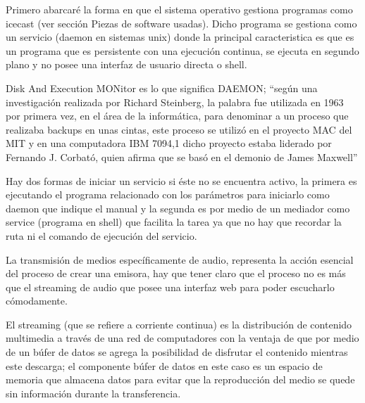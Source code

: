 \begin{multicols}{2}

Primero abarcaré la forma en que el sistema operativo gestiona programas como icecast (ver sección Piezas de software usadas). Dicho programa se gestiona como un servicio (daemon en sistemas unix) donde la principal caracteristica es que es un programa que es persistente con una ejecución continua, se ejecuta en segundo plano y no posee una interfaz de usuario directa o shell.

Disk And Execution MONitor es lo que significa DAEMON; ``según una investigación realizada por Richard Steinberg, la palabra fue utilizada en 1963 por primera vez, en el área de la informática, para denominar a un proceso que realizaba backups en unas cintas, este proceso se utilizó en el proyecto MAC del MIT y en una computadora IBM 7094,1 dicho proyecto estaba liderado por Fernando J. Corbató, quien afirma que se basó en el demonio de James Maxwell''\cite {ref1}

Hay dos formas de iniciar un servicio si éste no se encuentra activo, la primera es ejecutando el programa relacionado con los parámetros para iniciarlo como daemon que indique el manual y la segunda es por medio de un mediador como service (programa en shell) que facilita la tarea ya que no hay que recordar la ruta ni el comando de ejecución del servicio.


La transmisión de medios específicamente de audio, representa la acción esencial del proceso de crear una emisora, hay que tener claro que el proceso no es más que el streaming de audio que posee una interfaz web para poder escucharlo cómodamente.

\begin{center}
\end{center}

El streaming (que se refiere a corriente continua) es la distribución de contenido multimedia a través de una red de computadores con la ventaja de que por medio de un búfer de datos se agrega la posibilidad de disfrutar el contenido mientras este descarga; el componente búfer de datos en este caso es un espacio de memoria que almacena datos para evitar que la reproducción del medio se quede sin información durante la transferencia.



\end{multicols}
